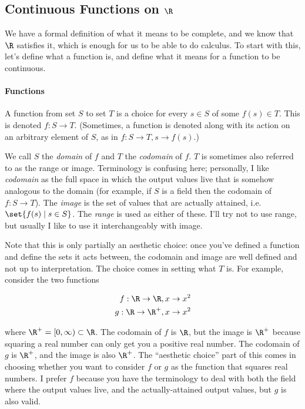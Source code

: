 \documentclass[./analysis.tex]{subfiles}
\begin{document}
    \subsection{Continuous Functions on $\R$}

    We have a formal definition of what it means to be complete, and we know that $\R$ satisfies it, which is enough for us to be able to do calculus. To start with this, let's define what a function is, and define what it means for a function to be continuous.

    \paragraph*{Functions} A function from set $S$ to set $T$ is a choice for every $s \in S$ of some $f(s) \in T$. This is denoted $f: S \to T$. (Sometimes, a function is denoted along with its action on an arbitrary element of $S$, as in $f: S \to T, s \to f(s)$.) 

    We call $S$ the \emph{domain} of $f$ and $T$ the \emph{codomain} of $f$. $T$ is sometimes also referred to as the range or image. Terminology is confusing here; personally, I like \emph{codomain} as the full space in which the output values live that is somehow analogous to the domain (for example, if $S$ is a field then the codomain of $f: S \to T$). The \emph{image} is the set of values that are actually attained, i.e. $\set{f(s) \mid s \in S}$. The \emph{range} is used as either of these. I'll try not to use range, but usually I like to use it interchangeably with image.

    Note that this is only partially an aesthetic choice: once you've defined a function and define the sets it acts between, the codomain and image are well defined and not up to interpretation. The choice comes in setting what $T$ is. For example, consider the two functions

    \begin{align*}
        f: \R \to \R, x \to x^2\\
        g: \R \to \R^+, x \to x^2
    \end{align*}

    where $\R^+ = [0, \infty) \subset \R$. The codomain of $f$ is $\R$, but the image is $\R^+$ because squaring a real number can only get you a positive real number. The codomain of $g$ is $\R^+$, and the image is also $\R^+$. The ``aesthetic choice'' part of this comes in choosing whether you want to consider $f$ or $g$ as the function that squares real numbers. I prefer $f$ because you have the terminology to deal with both the field where the output values live, and the actually-attained output values, but $g$ is also valid.
\end{document}
